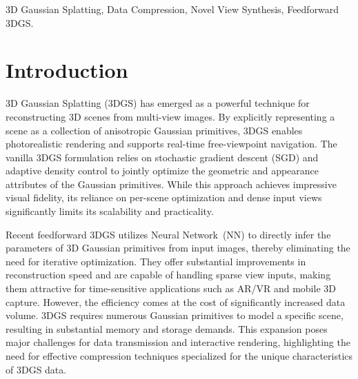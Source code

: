 \documentclass[lettersize,journal]{IEEEtran}
\begin{document}
\begin{abstract}

\end{abstract}

\begin{IEEEkeywords}
3D Gaussian Splatting, Data Compression, Novel View Synthesis, Feedforward 3DGS.
\end{IEEEkeywords}

\section{Introduction}
3D Gaussian Splatting (3DGS) has emerged as a powerful technique for reconstructing 3D scenes from multi-view images. 
By explicitly representing a scene as a collection of anisotropic Gaussian primitives, 3DGS enables photorealistic rendering and supports real-time free-viewpoint navigation. 
The vanilla 3DGS formulation relies on stochastic gradient descent (SGD) and adaptive density control to jointly optimize the geometric and appearance attributes of the Gaussian primitives. 
While this approach achieves impressive visual fidelity, its reliance on per-scene optimization and dense input views significantly limits its scalability and practicality.

Recent feedforward 3DGS utilizes Neural Network~(NN) to directly infer the parameters of 3D Gaussian primitives from input images, thereby eliminating the need for iterative optimization. 
They offer substantial improvements in reconstruction speed and are capable of handling sparse view inputs, making them attractive for time-sensitive applications such as AR/VR and mobile 3D capture. 
However, the efficiency comes at the cost of significantly increased data volume. 
3DGS requires numerous Gaussian primitives to model a specific scene, resulting in substantial memory and storage demands.
This expansion poses major challenges for data transmission and interactive rendering, highlighting the need for effective compression techniques specialized for the unique characteristics of 3DGS data.
\end{document}
